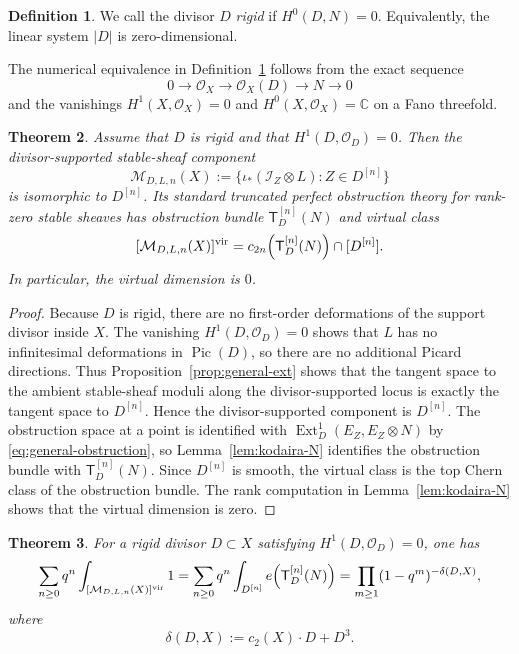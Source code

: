 \documentclass[12pt]{amsart}
\numberwithin{equation}{section}
\newcommand{\C}{\mathbb{C}}
\newcommand{\OO}{\mathcal{O}}
\newcommand{\I}{\mathcal{I}}
\newcommand{\M}{\mathcal{M}}
\newcommand{\Ext}{\operatorname{Ext}}
\newcommand{\Pic}{\operatorname{Pic}}
\newcommand{\Ttw}{\mathsf{T}}
\newcommand{\vfc}[1]{[#1]^{\mathrm{vir}}}
\theoremstyle{plain}
\newtheorem{theorem}{Theorem}[section]
\theoremstyle{definition}
\newtheorem{definition}[theorem]{Definition}
\theoremstyle{remark}
\begin{document}
\begin{definition}\label{def:rigid}
We call the divisor $D$ \emph{rigid} if $H^0(D,N)=0$.
Equivalently, the linear system $|D|$ is zero-dimensional.
\end{definition}

The numerical equivalence in Definition~\ref{def:rigid} follows from the exact sequence
\[
0\to \OO_X\to \OO_X(D)\to N\to 0
\]
and the vanishings $H^1(X,\OO_X)=0$ and $H^0(X,\OO_X)=\C$ on a Fano threefold.

\begin{theorem}\label{thm:rigid-component}
Assume that $D$ is rigid and that $H^1(D,\OO_D)=0$.
Then the divisor-supported stable-sheaf component
\[
\M_{D,L,n}(X):=\{\iota_*(\I_Z\otimes L): Z\in D^{[n]}\}
\]
is isomorphic to $D^{[n]}$.
Its standard truncated perfect obstruction theory for rank-zero stable sheaves has obstruction bundle $\Ttw_D^{[n]}(N)$ and virtual class
\begin{equation}\label{eq:rigid-vfc}
\vfc{\M_{D,L,n}(X)}=c_{2n}\Bigl(\Ttw_D^{[n]}(N)\Bigr)\cap [D^{[n]}].
\end{equation}
In particular, the virtual dimension is $0$.
\end{theorem}

\begin{proof}
Because $D$ is rigid, there are no first-order deformations of the support divisor inside $X$.
The vanishing $H^1(D,\OO_D)=0$ shows that $L$ has no infinitesimal deformations in $\Pic(D)$, so there are no additional Picard directions.
Thus Proposition~\ref{prop:general-ext} shows that the tangent space to the ambient stable-sheaf moduli along the divisor-supported locus is exactly the tangent space to $D^{[n]}$.
Hence the divisor-supported component is $D^{[n]}$.
The obstruction space at a point is identified with $\Ext^1_D(E_Z,E_Z\otimes N)$ by \eqref{eq:general-obstruction}, so Lemma~\ref{lem:kodaira-N} identifies the obstruction bundle with $\Ttw_D^{[n]}(N)$.
Since $D^{[n]}$ is smooth, the virtual class is the top Chern class of the obstruction bundle.
The rank computation in Lemma~\ref{lem:kodaira-N} shows that the virtual dimension is zero.
\end{proof}

\begin{theorem}\label{thm:general-rigid-series}
For a rigid divisor $D\subset X$ satisfying $H^1(D,\OO_D)=0$, one has
\begin{equation}\label{eq:general-rigid-series}
\sum_{n\ge 0}q^n\int_{\vfc{\M_{D,L,n}(X)}}1
=
\sum_{n\ge 0}q^n\int_{D^{[n]}}e\Bigl(\Ttw_D^{[n]}(N)\Bigr)
=
\prod_{m\ge 1}(1-q^m)^{-\delta(D,X)},
\end{equation}
where
\begin{equation}\label{eq:delta-def}
\delta(D,X):=c_2(X)\cdot D+D^3.
\end{equation}
\end{theorem}
\end{document}
